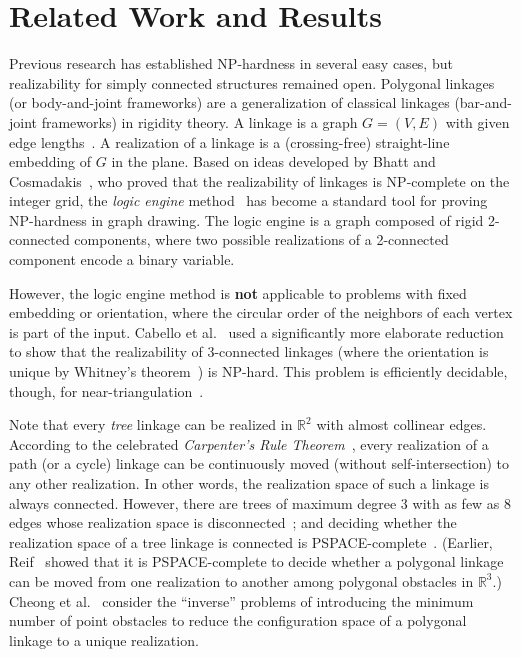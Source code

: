 \documentclass[10pt]{CSUNthesis}
\theoremstyle{plain}%
\theoremstyle{definition}
\theoremstyle{remark}
\newcommand{\RR}{\mathbb{R}} %
\begin{document}
\section{Related Work and Results}
Previous research has established NP-hardness in several easy cases, but realizability for simply connected structures remained open. Polygonal linkages (or body-and-joint frameworks) are a generalization of classical linkages (bar-and-joint frameworks) in rigidity theory. A linkage is a graph $G=(V,E)$ with given edge lengths~\cite{CD-ch9}. A realization of a linkage is a (crossing-free) straight-line embedding of $G$ in the plane. Based on ideas developed by Bhatt and Cosmadakis~\cite{BC87}, who proved that the realizability of linkages is NP-complete on the integer grid, the \emph{logic engine} method~\cite{BET+99,EW96,FHW97,HK01} has become a standard tool for proving NP-hardness in graph drawing. The logic engine is a graph composed of rigid 2-connected components, where two possible realizations of a 2-connected component encode a binary variable.

However, the logic engine method is \textbf{not} applicable to problems with fixed embedding or orientation, where the circular order of the neighbors of each vertex is part of the input. Cabello et al.~\cite{CDR07,EW90} used a significantly more elaborate reduction to show that the realizability of 3-connected linkages (where the orientation is unique by Whitney's theorem~\cite{W33}) is NP-hard. This problem is efficiently decidable, though, for near-triangulation~\cite{CDR07,BV96}.

Note that every \emph{tree} linkage can be realized in $\RR^2$ with almost collinear edges. According to the celebrated \emph{Carpenter's Rule Theorem}~\cite{CDR03,Str05}, every realization of a path (or a cycle) linkage can be continuously moved (without self-intersection) to any other realization. In other words, the realization space of such a linkage is always connected. However, there are trees of maximum degree 3 with as few as 8 edges whose realization space is disconnected~\cite{BCD+09}; and deciding whether the realization space of a tree linkage is connected is PSPACE-complete~\cite{AKR+04}.
(Earlier, Reif~\cite{Rei79} showed that it is PSPACE-complete to decide whether a polygonal linkage can be moved from one realization to another among polygonal obstacles in $\RR^3$.)
Cheong et al.~\cite{CdG+07} consider the ``inverse'' problems of introducing the minimum number of point obstacles to reduce the configuration space of a polygonal linkage to a unique realization.
\end{document}
